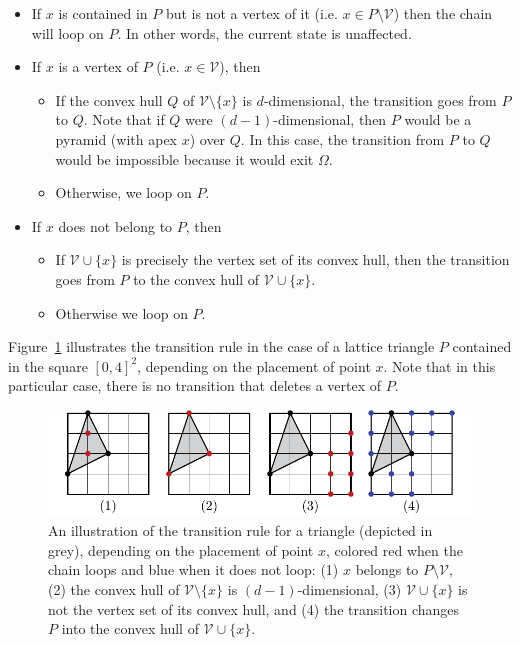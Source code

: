 \documentclass[a4paper]{article}
\begin{document}
\begin{itemize}
\item If $x$ is contained in $P$ but is not a vertex of it (i.e. $x\in{P}\mathord{\setminus}\mathcal{V}$) then the chain will loop on $P$. In other words, the current state is unaffected.
\item If $x$ is a vertex of $P$ (i.e. $x\in\mathcal{V}$), then
  \begin{itemize}
    \item If the convex hull $Q$ of $\mathcal{V}\mathord{\setminus}\{x\}$ is $d$-dimensional, the transition goes from $P$ to $Q$. Note that if $Q$ were $(d-1)$-dimensional, then $P$ would be a pyramid (with apex $x$) over $Q$. In this case, the transition from $P$ to $Q$ would be impossible because it would exit $\Omega$.
    \item Otherwise, we loop on $P$.
  \end{itemize}
  \item If $x$ does not belong to $P$, then
  \begin{itemize}
    \item If $\mathcal{V}\cup\{x\}$ is precisely the vertex set of its convex hull, then the transition goes from $P$ to the convex hull of $\mathcal{V}\cup \{x\}$.
    \item Otherwise we loop on $P$.
  \end{itemize}
\end{itemize}

Figure~\ref{fig:boucle} illustrates the transition rule in the case of a lattice triangle $P$ contained in the square $[0,4]^2$, depending on the placement of point $x$. Note that in this particular case, there is no transition that deletes a vertex of $P$.

\begin{figure}
  \begin{center}
    \includegraphics[scale=0.9]{boucle-mod}
    \caption{An illustration of the transition rule for a triangle (depicted in grey), depending on the placement of point $x$, colored red when the chain loops and blue when it does not loop: (1) $x$ belongs to $P\mathord{\setminus}\mathcal{V}$, (2) the convex hull of $\mathcal{V}\mathord{\setminus}\{x\}$ is $(d-1)$-dimensional, (3) $\mathcal{V}\cup\{x\}$ is not the vertex set of its convex hull, and (4) the transition changes $P$ into the convex hull of $\mathcal{V}\cup\{x\}$.}
    \label{fig:boucle}
  \end{center}
\end{figure}
\vspace{1ex}
\end{document}
